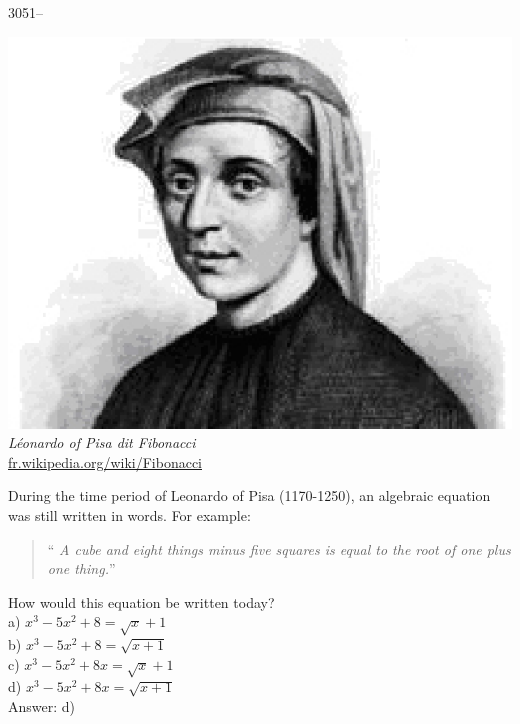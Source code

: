 \documentclass[letterpaper, 12pt]{article}
\begin{document}
3051--
\begin{center}
\includegraphics[scale=0.4]{Fibonacci.eps}\\
\emph{{\small L\'eonardo of Pisa {\scriptsize dit} Fibonacci}}\\
\href{http://fr.wikipedia.org/wiki/Fibonacci}{fr.wikipedia.org/wiki/Fibonacci}\\
\end{center}

During the time period of Leonardo of Pisa (1170-1250), an algebraic equation was still written in words. For example:\\
\begin{quote}
`` \emph{A cube and eight things minus five squares is equal to the root of one plus one thing.}''\\
\end{quote}
How would this equation be written today?\\

a) $x^{3} - 5x^{2} + 8 = \sqrt{x} + 1$\\[2mm]
b) $x^{3} - 5x^{2} + 8 = \sqrt{x + 1}$\\[2mm]
c) $x^{3} - 5x^{2} + 8x = \sqrt{x} + 1$\\[2mm]
d) $x^{3} - 5x^{2} + 8x = \sqrt{x + 1}$\\

Answer: d)\\
\end{document}
